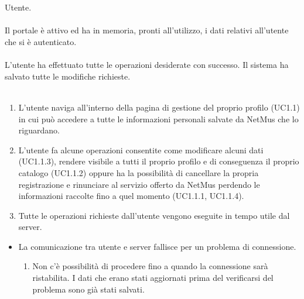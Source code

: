 \vspace*{0.5cm}
 \\\\
 Utente. \\\\
 Il portale \`e attivo ed ha in memoria, pronti all'utilizzo,
i dati relativi all'utente che si \`e autenticato.  \\\\ 
 L'utente ha effettuato tutte le operazioni desiderate con
successo. Il sistema ha salvato tutte le modifiche richieste. \\\\
\begin{enumerate}
  \item L'utente naviga all'interno della pagina di gestione del proprio profilo
  (UC1.1) in cui pu\`o accedere a tutte le informazioni personali salvate da
  NetMus che lo riguardano.
  \item L'utente fa alcune operazioni consentite come modificare alcuni
  dati (UC1.1.3), rendere visibile a tutti il proprio profilo e di conseguenza
  il proprio catalogo (UC1.1.2) oppure ha la possibilit\`a di cancellare la
  propria registrazione e rinunciare al servizio offerto da NetMus perdendo le
  informazioni raccolte fino a quel momento (UC1.1.1, UC1.1.4).
  \item Tutte le operazioni richieste dall'utente vengono eseguite in tempo
  utile dal server.
\end{enumerate}
\begin{itemize}
  \item La comunicazione tra utente e server fallisce per un problema di
  connessione.
  \begin {enumerate}
    \item Non c'\`e possibilit\`a di procedere fino a quando la connessione sar\`a
    ristabilita. I dati che erano stati aggiornati prima del verificarsi del
    problema sono gi\`a stati salvati.
  \end{enumerate}
\end{itemize}
\newpage

